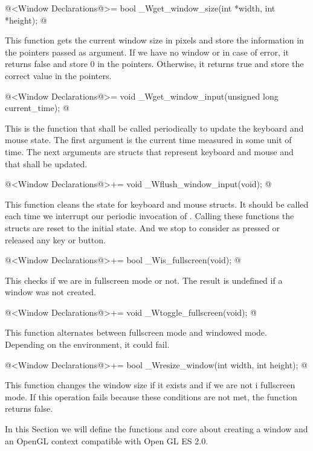 \iniciocodigo
@<Window Declarations@>=
bool _Wget_window_size(int *width, int *height);
@
\fimcodigo

This function gets the current window size in pixels and store the
information in the pointers passed as argument. If we have no window
or in case of error, it returns false and store 0 in the
pointers. Otherwise, it returns true and store the correct value in
the pointers.

\iniciocodigo
@<Window Declarations@>=
void _Wget_window_input(unsigned long current_time);
@
\fimcodigo

This is the function that shall be called periodically to update the
keyboard and mouse state. The first argument is the current time
measured in some unit of time. The next arguments are structs that
represent keyboard and mouse and that shall be updated.

\iniciocodigo
@<Window Declarations@>+=
void _Wflush_window_input(void);
@
\fimcodigo

This function cleans the state for keyboard and mouse structs. It
should be called each time we interrupt our periodic invocation
of . Calling these functions the
structs are reset to the initial state. And we stop to consider as
pressed or released any key or button.

\iniciocodigo
@<Window Declarations@>+=
bool _Wis_fullscreen(void);
@
\fimcodigo

This checks if we are in fullscreen mode or not. The result is
undefined if a window was not created.

\iniciocodigo
@<Window Declarations@>+=
void _Wtoggle_fullscreen(void);
@
\fimcodigo

This function alternates between fullscreen mode and windowed
mode. Depending on the environment, it could fail.

\iniciocodigo
@<Window Declarations@>+=
bool _Wresize_window(int width, int height);
@
\fimcodigo

This function changes the window size if it exists and if we are not i
fullscreen mode. If this operation fails because these conditions are
not met, the function returns false.


In this Section we will define the functions and core about creating a
window and an OpenGL context compatible with Open GL ES 2.0.


